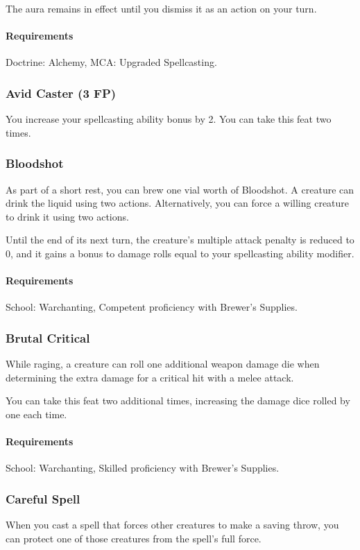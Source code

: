     The aura remains in effect until you dismiss it as an action on your turn.
    \paragraph{Requirements} Doctrine: Alchemy, MCA: Upgraded Spellcasting.
\subsubsection{Avid Caster (3 FP)} \label{feat::avidcaster}
    You increase your spellcasting ability bonus by 2.
    You can take this feat two times.
\subsubsection{Bloodshot} \label{feat::bloodshot}
    As part of a short rest, you can brew one vial worth of Bloodshot.
    A creature can drink the liquid using two actions.
    Alternatively, you can force a willing creature to drink it using two actions.

    Until the end of its next turn, the creature's multiple attack penalty is reduced to 0, and it gains a bonus to damage rolls equal to your spellcasting ability modifier.
    \paragraph{Requirements} School: Warchanting, Competent proficiency with Brewer's Supplies.
\subsubsection{Brutal Critical} \label{feat::brutalcritical}
    While raging, a creature can roll one additional weapon damage die when determining the extra damage for a critical hit with a melee attack.

    You can take this feat two additional times, increasing the damage dice rolled by one each time.
    \paragraph{Requirements} School: Warchanting, Skilled proficiency with Brewer's Supplies.
\subsubsection{Careful Spell} \label{feat::carefulspell}
    When you cast a spell that forces other creatures to make a saving throw, you can protect one of those creatures from the spell's full force.

